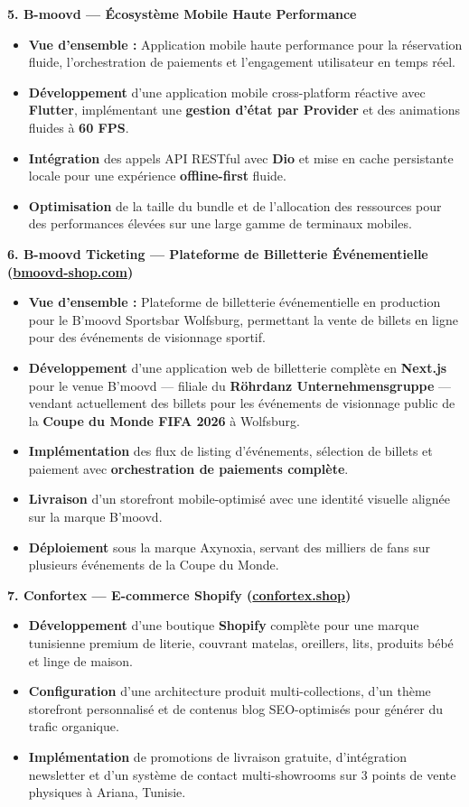 \documentclass[10pt, letterpaper]{article}
\newenvironment{highlights}{
\begin{itemize}[leftmargin=12pt, itemsep=2pt]
}{
\end{itemize}
}
\begin{document}
\textbf{5. B-moovd --- Écosystème Mobile Haute Performance}
\begin{highlights}
\item \textbf{Vue d'ensemble :} Application mobile haute performance pour la réservation fluide, l'orchestration de paiements et l'engagement utilisateur en temps réel.
\item \textbf{Développement} d'une application mobile cross-platform réactive avec \textbf{Flutter}, implémentant une \textbf{gestion d'état par Provider} et des animations fluides à \textbf{60 FPS}.
\item \textbf{Intégration} des appels API RESTful avec \textbf{Dio} et mise en cache persistante locale pour une expérience \textbf{offline-first} fluide.
\item \textbf{Optimisation} de la taille du bundle et de l'allocation des ressources pour des performances élevées sur une large gamme de terminaux mobiles.
\end{highlights}

\textbf{6. B-moovd Ticketing --- Plateforme de Billetterie Événementielle (\href{https://bmoovd-shop.com}{bmoovd-shop.com})}
\begin{highlights}
\item \textbf{Vue d'ensemble :} Plateforme de billetterie événementielle en production pour le B'moovd Sportsbar Wolfsburg, permettant la vente de billets en ligne pour des événements de visionnage sportif.
\item \textbf{Développement} d'une application web de billetterie complète en \textbf{Next.js} pour le venue B'moovd --- filiale du \textbf{Röhrdanz Unternehmensgruppe} --- vendant actuellement des billets pour les événements de visionnage public de la \textbf{Coupe du Monde FIFA 2026} à Wolfsburg.
\item \textbf{Implémentation} des flux de listing d'événements, sélection de billets et paiement avec \textbf{orchestration de paiements complète}.
\item \textbf{Livraison} d'un storefront mobile-optimisé avec une identité visuelle alignée sur la marque B'moovd.
\item \textbf{Déploiement} sous la marque Axynoxia, servant des milliers de fans sur plusieurs événements de la Coupe du Monde.
\end{highlights}

\textbf{7. Confortex --- E-commerce Shopify (\href{https://confortex.shop}{confortex.shop})}
\begin{highlights}
\item \textbf{Développement} d'une boutique \textbf{Shopify} complète pour une marque tunisienne premium de literie, couvrant matelas, oreillers, lits, produits bébé et linge de maison.
\item \textbf{Configuration} d'une architecture produit multi-collections, d'un thème storefront personnalisé et de contenus blog SEO-optimisés pour générer du trafic organique.
\item \textbf{Implémentation} de promotions de livraison gratuite, d'intégration newsletter et d'un système de contact multi-showrooms sur 3 points de vente physiques à Ariana, Tunisie.
\end{highlights}
\end{document}
